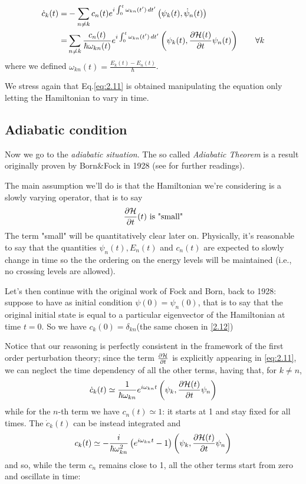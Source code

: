 \begin{align}
\dot{c}_k(t)=&-\sum_{n\neq k}c_n(t)e^{i\int_0^t\omega_{kn}(t')\mathop{}\!d t'} \left(\psi_k(t),\dot{\psi}_n(t)\right) \\
=&\sum_{n\neq k} \frac{c_n(t)}{\hbar\omega_{kn}(t)}e^{i\int_0^t\omega_{kn}(t')\mathop{}\!d t'}\left(\psi_k(t),\frac{\partial \mathcal{H}(t)}{\partial t}\psi_n(t) \right) \qquad \forall k 
\label{eq:2.11}
\end{align}
where we defined $ \omega_{kn}(t)=\frac{E_k(t)-E_n(t)}{\hbar} $.
\begin{rem}
	We stress again that Eq.\eqref{eq:2.11} is obtained manipulating the \Sch equation only letting the Hamiltonian to vary in time.
\end{rem}

\subsection{Adiabatic condition}
Now we go to the \emph{adiabatic situation}. The so called \textit{Adiabatic Theorem} is a result originally proven by Born\&Fock in 1928 (see \cite{born1928m} for further readings).

The main assumption we'll do is that the Hamiltonian we're considering is a slowly varying operator, that is to say
\begin{equation}
\frac{\partial \mathcal{H}}{\partial t}(t) \text{ is "small"}
\end{equation}
The term "small" will be quantitatively clear later on. Physically, it's reasonable to say that the quantities $ \psi_n(t), E_n(t) $ and $ c_n(t) $ are expected to slowly change in time so the the ordering on the energy levels will be maintained (i.e., no crossing levels are allowed).

Let's then continue with the original work of Fock and Born, back to 1928: suppose to have as initial condition $ \psi(0)=\psi_n(0) $, that is to say that the original initial state is equal to a particular eigenvector of the Hamiltonian at time $ t=0 $. So we have $ c_k(0)=\delta_{kn} $(the same chosen in \eqref{2.12})

Notice that our reasoning is perfectly consistent in the framework of the first order perturbation theory; since the term $ \frac{\partial \mathcal{H}}{\partial t} $ is explicitly appearing in \eqref{eq:2.11}, we can neglect the time dependency of all the other terms, having that, for $ k\neq n $, 
\begin{equation}
\dot{c}_k(t)\simeq \dfrac{1}{\hbar\omega_{kn}}e^{i\omega_{kn}t}\left(\psi_k,\frac{\partial \mathcal{H}(t)}{\partial t}\psi_n\right)
\end{equation}
while for the $ n $-th term we have $ c_n(t)\simeq 1 $: it starts at 1 and stay fixed for all times. 
The $ \dot{c}_k(t) $ can be instead integrated and 
\begin{equation}
c_k(t)\simeq -\dfrac{i}{\hbar\omega_{kn}^2}\left(e^{i\omega_{kn}t}-1\right)\left(\psi_k,\frac{\partial \mathcal{H}(t)}{\partial t}\psi_n\right)
\end{equation}
and so, while the term $ c_n $ remains close to 1, all the other terms start from zero and oscillate in time: 

